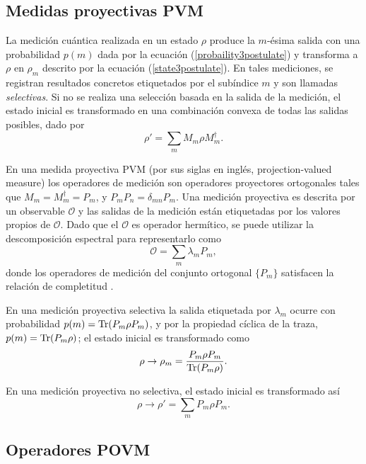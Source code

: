 \subsection{Medidas proyectivas PVM}\label{subsec:Cap1:medidasproyectivasPVM} %
La medición cuántica realizada en un estado $\rho$ produce  la $m$-ésima 
salida con una probabilidad $p(m)$ dada por la ecuación
(\ref{probaility3postulate}) y transforma a $\rho $ en $\rho_m$ descrito por la
ecuación (\ref{state3postulate}). En tales mediciones, se registran resultados
concretos etiquetados por el subíndice $m$ y son llamadas \textit{selectivas}.
Si no se realiza una selección basada en la salida de la medición, el estado
inicial es transformado en una combinación convexa de todas las salidas
posibles, dado por 
\begin{equation}\label{eq: non-selective-measure}
	\rho'=\sum_m M_m\rho M_m^\dagger.
\end{equation}

En una medida proyectiva PVM (por sus siglas en inglés, projection-valued
measure) los operadores de medición son operadores proyectores ortogonales
tales que $M_{m}=M_{m}^{\dagger}=P_{m}$, y $P_{m}P_{n}=\delta_{mn}P_{m}$. Una
medición proyectiva es descrita por un observable $\mathcal{O}$ y las salidas
de la medición están etiquetadas por los valores propios de $\mathcal{O}$. Dado
que el $\mathcal{O}$ es operador hermítico, se puede utilizar la descomposición
espectral para representarlo como \begin{equation}
	\mathcal{O}=\sum_m \lambda_m P_m,
\end{equation} donde los operadores de medición del conjunto ortogonal $\{P_m\}$ satisfacen la relación de completitud {\cite{2007geometry}}. 

En una medición proyectiva selectiva la salida etiquetada por $\lambda_m$
ocurre con probabilidad $p(m)={\rm Tr}(P_m\rho P_m)$, y por la propiedad cíclica de
la traza,  $p(m)={\rm Tr}(P_m\rho)$; el estado inicial es transformado como 
\begin{equation}\label{stateProjective}
	\rho\to	\rho_m=\dfrac{P_m\rho P_m}{{\rm Tr}(P_m \rho)}.
\end{equation}

 En una medición proyectiva no selectiva, el estado inicial es transformado así
\begin{equation}
	\rho \to \rho'=\sum_m P_m \rho P_m.
\end{equation} 
\subsection{Operadores POVM}\label{subsec:operadoresPOVM} %

